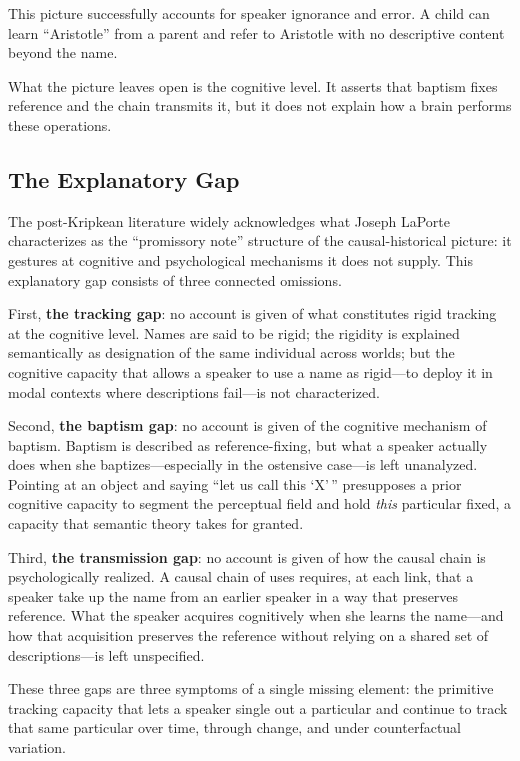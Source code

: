 \documentclass[12pt,a4paper]{article}
\begin{document}
This picture successfully accounts for speaker ignorance and error. A child can learn ``Aristotle'' from a parent and refer to Aristotle with no descriptive content beyond the name.

What the picture leaves open is the cognitive level. It asserts that baptism fixes reference and the chain transmits it, but it does not explain how a brain performs these operations.

\subsection{The Explanatory Gap}\label{the-explanatory-gap}

The post-Kripkean literature widely acknowledges what Joseph LaPorte characterizes as the ``promissory note'' structure of the causal-historical picture: it gestures at cognitive and psychological mechanisms it does not supply. This explanatory gap consists of three connected omissions.

First, \textbf{the tracking gap}: no account is given of what constitutes rigid tracking at the cognitive level. Names are said to be rigid; the rigidity is explained semantically as designation of the same individual across worlds; but the cognitive capacity that allows a speaker to use a name as rigid---to deploy it in modal contexts where descriptions fail---is not characterized.

Second, \textbf{the baptism gap}: no account is given of the cognitive mechanism of baptism. Baptism is described as reference-fixing, but what a speaker actually does when she baptizes---especially in the ostensive case---is left unanalyzed. Pointing at an object and saying ``let us call this `X'\,'' presupposes a prior cognitive capacity to segment the perceptual field and hold \emph{this} particular fixed, a capacity that semantic theory takes for granted.

Third, \textbf{the transmission gap}: no account is given of how the causal chain is psychologically realized. A causal chain of uses requires, at each link, that a speaker take up the name from an earlier speaker in a way that preserves reference. What the speaker acquires cognitively when she learns the name---and how that acquisition preserves the reference without relying on a shared set of descriptions---is left unspecified.

These three gaps are three symptoms of a single missing element: the primitive tracking capacity that lets a speaker single out a particular and continue to track that same particular over time, through change, and under counterfactual variation.
\end{document}
